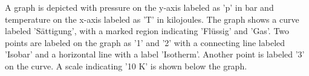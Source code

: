 A graph is depicted with pressure on the y-axis labeled as 'p' in bar and temperature on the x-axis labeled as 'T' in kilojoules. The graph shows a curve labeled 'Sättigung', with a marked region indicating 'Flüssig' and 'Gas'. Two points are labeled on the graph as '1' and '2' with a connecting line labeled 'Isobar' and a horizontal line with a label 'Isotherm'. Another point is labeled '3' on the curve. A scale indicating '10 K' is shown below the graph.